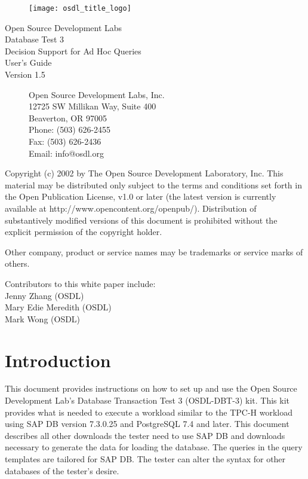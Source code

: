\documentclass{article}
\begin{document}
\begin{titlepage}

\begin{figure}[t]
\centering
\texttt{[image: osdl\_title\_logo]}
\end{figure}

\centering
\huge
Open Source Development Labs \\
Database Test 3 \\
Decision Support for Ad Hoc Queries \\
\huge
User's Guide \\
\large
Version 1.5

\begin{figure}[b]
\flushleft
\normalsize
Open Source Development Labs, Inc. \\
12725 SW Millikan Way, Suite 400 \\
Beaverton, OR 97005 \\
Phone: (503) 626-2455 \\
Fax: (503) 626-2436 \\
Email: info@osdl.org
\end{figure}

\end{titlepage}

\noindent
Copyright (c) 2002 by The Open Source Development Laboratory, Inc. This
material may be distributed only subject to the terms and conditions set forth
in the Open Publication License, v1.0 or later (the latest version is currently
available at http://www.opencontent.org/openpub/). Distribution of
substantively modified versions of this document is prohibited without the
explicit permission of the copyright holder.

\noindent
Other company, product or service names may be trademarks or service marks of
others.

\noindent
Contributors to this white paper include: \\
\indent Jenny Zhang (OSDL) \\
\indent Mary Edie Meredith (OSDL) \\
\indent Mark Wong (OSDL) \\

\pagebreak

\section{Introduction}

\noindent
This document provides instructions on how to set up and use the
Open Source Development Lab's Database Transaction Test 3
(OSDL-DBT-3) kit.  This kit provides what is needed to execute a
workload similar to the TPC-H workload using SAP DB version 7.3.0.25
and PostgreSQL 7.4 and later.  This document describes all other
downloads the tester need to use SAP DB and downloads necessary to
generate the data for loading the database.  The queries in the query
templates are tailored for SAP DB.  The tester can alter the syntax
for other databases of the tester's desire.
\end{document}
